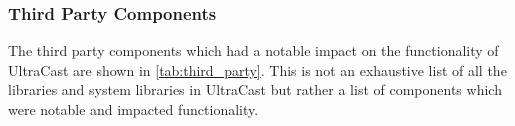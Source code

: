\documentclass[../report.tex]{subfiles}
\begin{document}
\newpage

\subsubsection{Third Party Components}

The third party components which had a notable impact on the functionality
of UltraCast are shown in \cref{tab:third_party}. This is not an exhaustive
list of all the libraries and system libraries in UltraCast but rather a list
of components which were notable and impacted functionality.
\end{document}
